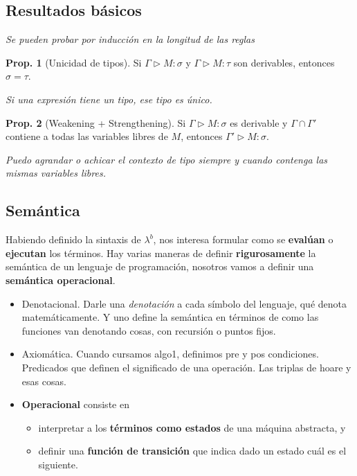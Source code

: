 \documentclass{report}
\theoremstyle{definition} %
\newtheorem{proposition}{Prop.}[chapter]
\newcommand{\lambdab}{\lambda^b}
\newcommand{\tipa}[3]{#1 \rhd #2 : #3} %
\newcommand{\Gtipa}[2]{\tipa{\Gamma}{#1}{#2}}
\begin{document}
\subsection{Resultados básicos}

\textit{Se pueden probar por inducción en la longitud de las reglas}

\begin{proposition}[Unicidad de tipos]
    Si $\Gtipa{M}{\sigma}$ y $\Gtipa{M}{\tau}$ son derivables, entonces $\sigma
    = \tau$.

    \textit{Si una expresión tiene un tipo, ese tipo es único.}
\end{proposition}

\begin{proposition}[Weakening + Strengthening]
    Si $\Gtipa{M}{\sigma}$ es derivable y $\Gamma \cap \Gamma'$ contiene a todas
    las variables libres de $M$, entonces $\tipa{\Gamma'}{M}{\sigma}$.

    \textit{Puedo agrandar o achicar el contexto de tipo siempre y cuando contenga las mismas variables libres.}
\end{proposition}

\subsection{Semántica}

Habiendo definido la sintaxis de $\lambdab$, nos interesa formular como se
\textbf{evalúan} o \textbf{ejecutan} los términos. Hay varias maneras de definir
\textbf{rigurosamente} la semántica de un lenguaje de programación, nosotros
vamos a definir una \textbf{semántica operacional}.

\begin{itemize}
    \item Denotacional. Darle una \textit{denotación} a cada símbolo del
    lenguaje, qué denota matemáticamente. Y uno define la semántica en términos
    de como las funciones van denotando cosas, con recursión o puntos fijos.
    \item Axiomática. Cuando cursamos algo1, definimos pre y pos condiciones.
    Predicados que definen el significado de una operación. Las triplas de hoare y
    esas cosas.
    \item \textbf{Operacional} consiste en
    \begin{itemize}
        \item interpretar a los \textbf{términos como estados} de una máquina
        abstracta, y
        \item definir una \textbf{función de transición} que indica dado un
        estado cuál es el siguiente. 
    \end{itemize}
\end{itemize}
\end{document}
